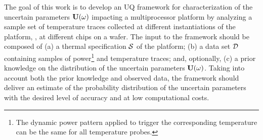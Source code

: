 The goal of this work is to develop an UQ framework for characterization of the uncertain parameters $\mathbf{U}(\omega)$ impacting a multiprocessor platform by analyzing a sample set of temperature traces collected at different instantiations of the platform, \eg, at different chips on a wafer. The input to the framework should be composed of (a) a thermal specification $\mathcal{S}$ of the platform; (b) a data set $\mathcal{D}$ containing samples of power\footnote{The dynamic power pattern applied to trigger the corresponding temperature can be the same for all temperature probes.} and temperature traces; and, optionally, (c) a prior knowledge on the distribution of the uncertain parameters $\mathbf{U}(\omega)$. Taking into account both the prior knowledge and observed data, the framework should deliver an estimate of the probability distribution of the uncertain parameters with the desired level of accuracy and at low computational costs.
